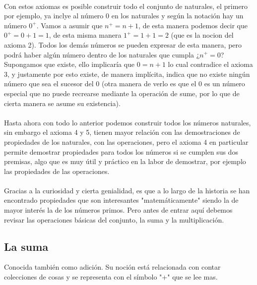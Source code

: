 \documentclass{article}
\begin{document}
\paragraph{} Con estos axiomas es posible construir todo el conjunto de naturales, el primero por ejemplo, ya inclye al número $0$ en los naturales y según la notación hay un número $0^+$. Vamos a asumir que $n^+ = n + 1$,  de esta manera podemos decir que $0^+ = 0 + 1 = 1$, de esta misma manera $1^+ = 1 + 1 = 2$ (que es la nocion del axioma 2). Todos los demás números se pueden expresar de esta manera, pero podrá haber algún número dentro de los naturales que cumpla ¿$n^+ = 0$? Supongamos que existe, ello implicaría que $0 = n + 1$ lo cual contradice el axioma 3, y justamente por esto existe, de manera implícita, indica que no existe ningún número que sea el sucesor del 0 (otra manera de verlo es que el 0 es un número especial que no puede recrearse mediante la operación de sume, por lo que de cierta manera se asume su existencia).

\paragraph{} Hasta ahora con todo lo anterior podemos construir todos los números naturales, sin embargo el axioma 4 y 5, tienen mayor relación con las demostraciones de propiedades de los naturales, con las operaciones, pero el axioma 4 en particular permite demostrar propiedades para todos los números si se cumplen sus dos premisas, algo que es muy útil y práctico en la labor de demostrar, por ejemplo las propiedades de las operaciones.

\paragraph{} Gracias a la curiosidad y cierta genialidad, es que a lo largo de la historia se han encontrado propiedades que son interesantes "matemáticamente" siendo la de mayor interés la de los números primos. Pero antes de entrar aquí debemos revisar las operaciones básicas del conjunto, la suma y la multiplicación.

\subsection{La suma}

Conocida también como adición. Su noción está relacionada con contar colecciones de cosas y se representa con el símbolo "+" que se lee mas.
\end{document}

